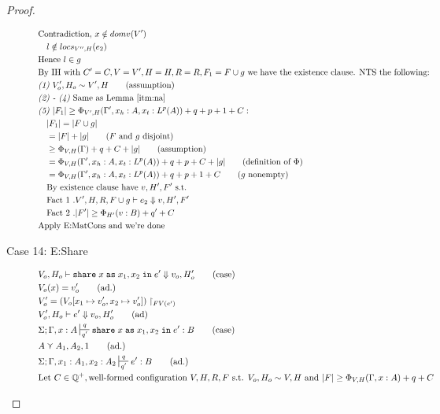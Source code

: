 \documentclass{easychair}
\newcommand{\irl}[1]{\mathtt{#1}}
\newcommand{\sharecpcst}[4]{\irl{share}\;#1\;\irl{as}\;#2,#3\;\irl{in}\;#4}
\theoremstyle{definition}
\begin{document}
\begin{proof}
\begin{description}
\begin{align*}
		&\text{Contradiction, } x \notin domv(V')\\
  &\quad l \notin locs_{V'',H}(e_2)\\
  &\text{Hence } l \in g\\
	&\text{By IH with } C' = C, V = V', H = H, R = R, F_1 = F \cup g 
		\text{ we have the existence clause. NTS the following: } \\
	&\emph{(1) } V_o',H_o \sim V',H \tag{assumption} \\
	&\emph{(2) - (4) } \text{Same as Lemma~\ref{itm:na}}\\
		&\emph{(5) } |F_1| \ge \Phi_{V',H}(\Gamma',x_h:A,x_t:L^p(A)) + q + p + 1 + C:\\
	&\quad |F_1| = |F \cup g|\\
	&\quad = |F| + |g| \tag{$F$ and $g$ disjoint}\\
	&\quad \ge \Phi_{V,H}(\Gamma) + q + C + |g| \tag{assumption}\\
		&\quad = \Phi_{V,H}(\Gamma',x_h:A,x_t:L^p(A)) + q+ p + C + |g| \tag{definition of $\Phi$}\\
	&\quad = \Phi_{V,H}(\Gamma',x_h:A,x_t:L^p(A)) + q + p + 1 + C \tag{$g$ nonempty}\\
		&\quad\text{By existence clause have } v,H',F' \text{ s.t. }\\
		&\quad \text{Fact 1 }. V',H,R,F\cup g \vdash e_2 \Downarrow v,H',F'\\
		&\quad \text{Fact 2 }. |F'| \ge \Phi_{H'}(v:B) + q' + C\\
	&\text{Apply E:MatCons and we're done}
  \end{align*}
  \item[Case 14: E:Share]
	\begin{align*}
	&V_o,H_o \vdash \sharecpcst{x}{x_1}{x_2}{e'}  \Downarrow v_o,H_o' \tag{case}\\
	&V_o(x) = v_o' \tag{ad.}\\
	&V_o' = (V_o[x_1 \mapsto v_o',x_2 \mapsto v_o']) \restriction_{FV(e')}\\
	&V_o', H_o \vdash e' \Downarrow v_o,H_o' \tag{ad}\\
	&\Sigma;\Gamma,x:A \sststile{q'}{q} \sharecpcst{x}{x_1}{x_2}{e'}: B \tag{case}\\
	&A \curlyvee A_1,A_2,1 \tag{ad.}\\
	&\Sigma; \Gamma,x_1:A_1,x_2:A_2 \sststile{q'}{q} e' : B \tag{ad.}\\
&\text{Let } C \in \mathbb{Q}^+, \text{well-formed configuration } V,H,R,F \text{ s.t. }
		V_o,H_o \sim V,H
			\text{ and }|F| \ge \Phi_{V,H}(\Gamma,x:A) + q + C\\

\end{align*}
\end{description}
\end{proof}
\end{document}
